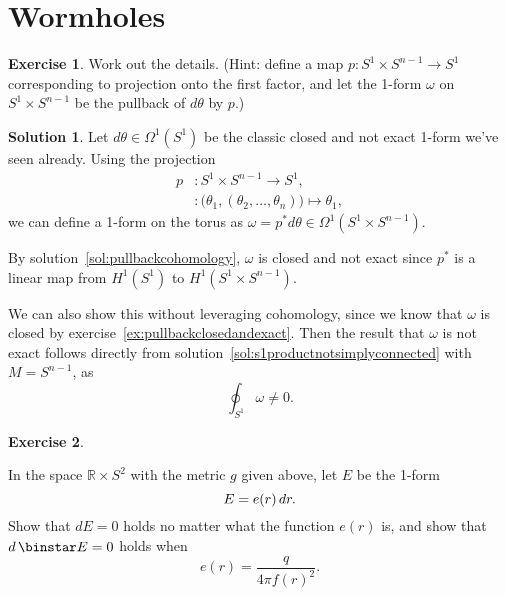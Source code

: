 \documentclass[11pt, a4paper]{report}
\theoremstyle{definition}
\newtheorem{exercise}{Exercise}[part]
\newtheorem{solution}{Solution}[part]
\newenvironment{ex}{\begin{exercise}}{\end{exercise}\pagebreak[1]}
\newenvironment{sol}{\begin{solution}}{\end{solution}\pagebreak[3]}
\renewcommand*{\d}{\ensuremath\mathop{}\mathopen{}d}
\renewcommand*{\star}{\ensuremath\mathop{}\mathopen\binstar\mathord{}}
\begin{document}
\section{Wormholes}

\begin{ex}

Work out the details. (Hint: define a map $p: S^1 \times S^{n - 1} \to S^1$ corresponding to projection onto the first factor, and let the 1-form $\omega$ on $S^1 \times S^{n - 1}$ be the pullback of $d\theta$ by $p$.)

\end{ex}

\begin{sol}

Let $d\theta \in \Omega^1(S^1)$ be the classic closed and not exact 1-form we've seen already. Using the projection
\begin{align*}
    p &: S^1 \times S^{n - 1} \to S^1, \\
      &: \bigl( \theta_1, (\theta_2, \ldots, \theta_n) \bigr) \mapsto \theta_1,
\end{align*}
we can define a 1-form on the torus as $\omega = p^* d\theta \in \Omega^1(S^1 \times S^{n - 1})$.

By solution~\ref{sol:pullbackcohomology}, $\omega$ is closed and not exact since $p^*$ is a linear map from $H^1(S^1)$ to $H^1(S^1 \times S^{n - 1})$.

We can also show this without leveraging cohomology, since we know that $\omega$ is closed by exercise~\ref{ex:pullbackclosedandexact}. Then the result that $\omega$ is not exact follows directly from solution~\ref{sol:s1productnotsimplyconnected} with $M = S^{n - 1}$, as
\[
    \oint_{S^1} \omega \neq 0.
\]

\end{sol}

\begin{ex}\label{ex:vacuumelectrostaticwormhole}

In the space $\mathbb{R} \times S^2$ with the metric $g$ given above, let $E$ be the 1-form
\[
    E = e(r) \d r.
\]
Show that $dE = 0$ holds no matter what the function $e(r)$ is, and show that $d \star E = 0$ holds when
\[
    e(r) = \frac{q}{4 \pi {f(r)}^2}.
\]

\end{ex}
\end{document}
